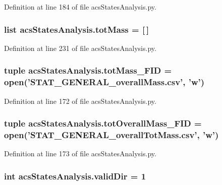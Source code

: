Definition at line 184 of file acs\-States\-Analysis.\-py.

\hypertarget{a00130_ac2ecae6789d89cc56b0a731065837774}{
\subsubsection[{tot\-Mass}]{\setlength{\rightskip}{0pt plus 5cm}list acs\-States\-Analysis.\-tot\-Mass = \mbox{[}$\,$\mbox{]}}}\label{a00130_ac2ecae6789d89cc56b0a731065837774}


Definition at line 231 of file acs\-States\-Analysis.\-py.

\hypertarget{a00130_a1b7f5672822b59c7284cd2b703aacbc2}{
\subsubsection[{tot\-Mass\-\_\-\-F\-I\-D}]{\setlength{\rightskip}{0pt plus 5cm}tuple acs\-States\-Analysis.\-tot\-Mass\-\_\-\-F\-I\-D = open('S\-T\-A\-T\-\_\-\-G\-E\-N\-E\-R\-A\-L\-\_\-overall\-Mass.\-csv', 'w')}}\label{a00130_a1b7f5672822b59c7284cd2b703aacbc2}


Definition at line 172 of file acs\-States\-Analysis.\-py.

\hypertarget{a00130_a20a06acdb6e82bcaab87d2781d3555a9}{
\subsubsection[{tot\-Overall\-Mass\-\_\-\-F\-I\-D}]{\setlength{\rightskip}{0pt plus 5cm}tuple acs\-States\-Analysis.\-tot\-Overall\-Mass\-\_\-\-F\-I\-D = open('S\-T\-A\-T\-\_\-\-G\-E\-N\-E\-R\-A\-L\-\_\-overall\-Tot\-Mass.\-csv', 'w')}}\label{a00130_a20a06acdb6e82bcaab87d2781d3555a9}


Definition at line 173 of file acs\-States\-Analysis.\-py.

\hypertarget{a00130_aebb18ab2b73e7e2705ee42c728c0a72b}{
\subsubsection[{valid\-Dir}]{\setlength{\rightskip}{0pt plus 5cm}int acs\-States\-Analysis.\-valid\-Dir = 1}}\label{a00130_aebb18ab2b73e7e2705ee42c728c0a72b}


